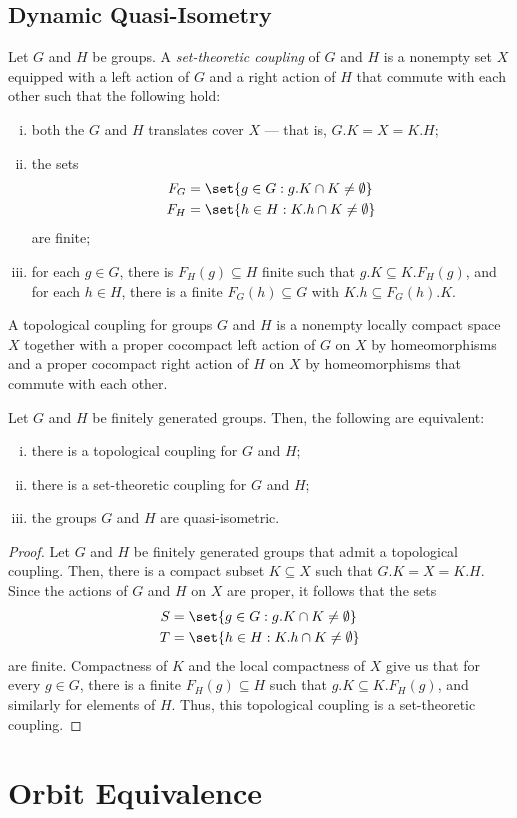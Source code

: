 \documentclass[10pt]{mypackage}
\begin{document}
\subsection{Dynamic Quasi-Isometry}%
\begin{definition}
  Let $G$ and $H$ be groups. A \textit{set-theoretic coupling} of $G$ and $H$ is a nonempty set $X$ equipped with a left action of $G$ and a right action of $H$ that commute with each other such that the following hold:
  \begin{enumerate}[(i)]
    \item both the $G$ and $H$ translates cover $X$ --- that is, $G.K = X = K.H$;
    \item the sets
      \begin{align*}
        F_G &= \set{g\in G : g.K\cap K\neq \emptyset}\\
        F_H &= \set{h\in H : K.h\cap K \neq \emptyset}
      \end{align*}
      are finite;
    \item for each $g\in G$, there is $F_H(g)\subseteq H$ finite such that $g.K\subseteq K.F_H(g)$, and for each $h\in H$, there is a finite $F_G(h)\subseteq G$ with $K.h\subseteq F_G(h).K$.
  \end{enumerate}
\end{definition}
\begin{definition}
  A topological coupling for groups $G$ and $H$ is a nonempty locally compact space $X$ together with a proper cocompact left action of $G$ on $X$ by homeomorphisms and a proper cocompact right action of $H$ on $X$ by homeomorphisms that commute with each other.
\end{definition}
\begin{theorem}
  Let $G$ and $H$ be finitely generated groups. Then, the following are equivalent:
  \begin{enumerate}[(i)]
    \item there is a topological coupling for $G$ and $H$;
    \item there is a set-theoretic coupling for $G$ and $H$;
    \item the groups $G$ and $H$ are quasi-isometric.
  \end{enumerate}
\end{theorem}
\begin{proof}
  Let $G$ and $H$ be finitely generated groups that admit a topological coupling. Then, there is a compact subset $K\subseteq X$ such that $G.K = X = K.H$. Since the actions of $G$ and $H$ on $X$ are proper, it follows that the sets
  \begin{align*}
    S &= \set{g\in G : g.K\cap K \neq \emptyset}\\
    T &= \set{h\in H : K.h\cap K\neq \emptyset}
  \end{align*}
  are finite. Compactness of $K$ and the local compactness of $X$ give us that for every $g\in G$, there is a finite $F_H(g)\subseteq H$ such that $g.K\subseteq K.F_H(g)$, and similarly for elements of $H$. Thus, this topological coupling is a set-theoretic coupling.
\end{proof}
\section{Orbit Equivalence}%

\nocite{loh_geometric_group_theory,furman2010surveymeasuredgrouptheory}
\printbibliography
\end{document}
